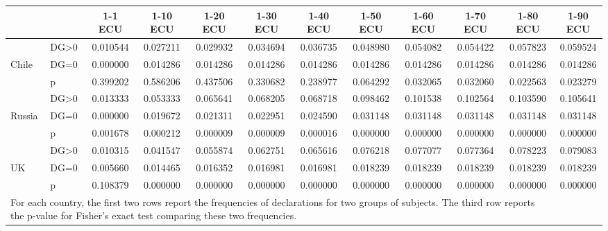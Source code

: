 \def\sym#1{\ifmmode^{#1}\else\(^{#1}\)\fi}
\begin{tabular}{|ll|cccccccccc|}
\hline\hline
&&1-1 ECU&1-10 ECU&1-20 ECU&1-30 ECU&1-40 ECU&1-50 ECU&1-60 ECU&1-70 ECU&1-80 ECU&1-90 ECU\\
\hline
&DG>0& 0.010544& 0.027211& 0.029932& 0.034694& 0.036735& 0.048980& 0.054082& 0.054422& 0.057823& 0.059524\\
Chile&DG=0& 0.000000& 0.014286& 0.014286& 0.014286& 0.014286& 0.014286& 0.014286& 0.014286& 0.014286& 0.014286\\
&p& 0.399202& 0.586206& 0.437506& 0.330682& 0.238977& 0.064292& 0.032065& 0.032060& 0.022563& 0.023279\\
\hline&DG>0& 0.013333& 0.053333& 0.065641& 0.068205& 0.068718& 0.098462& 0.101538& 0.102564& 0.103590& 0.105641\\
Russia&DG=0& 0.000000& 0.019672& 0.021311& 0.022951& 0.024590& 0.031148& 0.031148& 0.031148& 0.031148& 0.031148\\
&p& 0.001678& 0.000212& 0.000009& 0.000009& 0.000016& 0.000000& 0.000000& 0.000000& 0.000000& 0.000000\\
\hline&DG>0& 0.010315& 0.041547& 0.055874& 0.062751& 0.065616& 0.076218& 0.077077& 0.077364& 0.078223& 0.079083\\
UK&DG=0& 0.005660& 0.014465& 0.016352& 0.016981& 0.016981& 0.018239& 0.018239& 0.018239& 0.018239& 0.018239\\
&p& 0.108379& 0.000000& 0.000000& 0.000000& 0.000000& 0.000000& 0.000000& 0.000000& 0.000000& 0.000000\\
\hline\multicolumn{11}{p{15cm}}{\tiny For each country, the first two rows report the frequencies of declarations for two groups of subjects. The third row reports the p-value for Fisher's exact test comparing these two frequencies.}\\
\end{tabular}